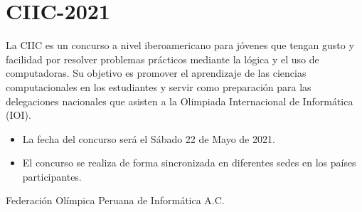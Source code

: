 \documentclass{article}
\begin{document}
\section{CIIC-2021}

La CIIC es un concurso a nivel iberoamericano para jóvenes que tengan gusto y facilidad por resolver problemas prácticos mediante la lógica y el uso de computadoras. Su objetivo es promover el aprendizaje de las ciencias computacionales en los estudiantes y servir como preparación para las delegaciones nacionales que asisten a la Olimpiada Internacional de Informática (IOI).

\begin{itemize}
\item 
La fecha del concurso será el {\color{red} Sábado 22 de Mayo de 2021}.

\item 

El concurso se realiza de forma sincronizada en diferentes sedes en los países participantes.



\end{itemize}
\vspace*{1.5cm}

\hspace*{\fill}
Federación Olímpica Peruana de Informática A.C.

%
%
\end{document}
